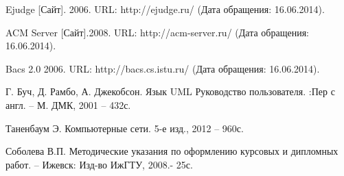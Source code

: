 \begin{thebibliography}{9}

Ejudge [Сайт]. 2006. URL: http://ejudge.ru/ (Дата обращения: 16.06.2014).

ACM Server [Сайт].2008. URL: http://acm-server.ru/ (Дата обращения: 16.06.2014).

Bacs 2.0 2006. URL: http://bacs.cs.istu.ru/ (Дата обращения: 16.06.2014).

Г. Буч, Д. Рамбо, А. Джекобсон. Язык UML Руководство пользователя. :Пер с англ. – М. ДМК, 2001 – 432с.

Таненбаум Э. Компьютерные сети. 5-е изд., 2012 -- 960с.

Соболева В.П. Методические указания по оформлению курсовых и дипломных работ. – Ижевск: Изд-во ИжГТУ, 2008.- 25с.

\end{thebibliography}
